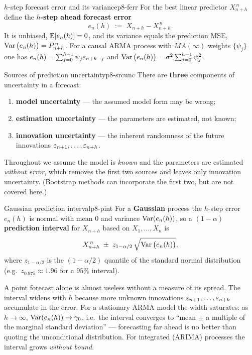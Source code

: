 \begin{definition}{$h$-step forecast error and its variance}{p8-ferr}
For the best linear predictor $X^{\,n}_{n+h}$ define the \textbf{$h$-step ahead
forecast error}
\[
e_n(h)\;:=\;X_{n+h}-X^{\,n}_{n+h}.
\]
It is unbiased, $\mathbb{E}[e_n(h)]=0$, and its variance equals the prediction MSE,
$\operatorname{Var}\big(e_n(h)\big)=P^{\,n}_{n+h}$. For a causal ARMA process with
$MA(\infty)$ weights $\{\psi_j\}$ one has
$e_n(h)=\sum_{j=0}^{h-1}\psi_j\varepsilon_{n+h-j}$ and
$\operatorname{Var}\big(e_n(h)\big)=\sigma^2\sum_{j=0}^{h-1}\psi_j^2$.
\end{definition}

\begin{definition}{Sources of prediction uncertainty}{p8-srcunc}
There are \textbf{three} components of uncertainty in a forecast:
\begin{enumerate}
  \item \textbf{model uncertainty} --- the assumed model form may be wrong;
  \item \textbf{estimation uncertainty} --- the parameters are estimated, not known;
  \item \textbf{innovation uncertainty} --- the inherent randomness of the future
        innovations $\varepsilon_{n+1},\dots,\varepsilon_{n+h}$.
\end{enumerate}
Throughout we assume the model is \emph{known} and the parameters are estimated
\emph{without error}, which removes the first two sources and leaves only
innovation uncertainty. (Bootstrap methods can incorporate the first two, but
are not covered here.)
\end{definition}

\begin{definition}{Gaussian prediction interval}{p8-pint}
For a \textbf{Gaussian} process the $h$-step error $e_n(h)$ is normal with mean
$0$ and variance $\operatorname{Var}(e_n(h))$, so a $(1-\alpha)$ \textbf{prediction interval}
for $X_{n+h}$ based on $X_1,\dots,X_n$ is
\[
X^{\,n}_{n+h}\;\pm\;z_{1-\alpha/2}\,\sqrt{\operatorname{Var}\big(e_n(h)\big)},
\]
where $z_{1-\alpha/2}$ is the $(1-\alpha/2)$ quantile of the standard normal
distribution (e.g.\ $z_{0.975}\approx1.96$ for a $95\%$ interval).
\end{definition}

\begin{intuition}
A point forecast alone is almost useless without a measure of its spread. The
interval widens with $h$ because more unknown innovations
$\varepsilon_{n+1},\dots,\varepsilon_{n+h}$ accumulate in the error. For a stationary ARMA
model the width saturates: as $h\to\infty$, $\operatorname{Var}(e_n(h))\to\gamma_0$, i.e.\ the
interval converges to ``mean $\pm$ a multiple of the marginal standard
deviation'' --- forecasting far ahead is no better than quoting the
unconditional distribution. For integrated (ARIMA) processes the interval grows
\emph{without bound}.
\end{intuition}

